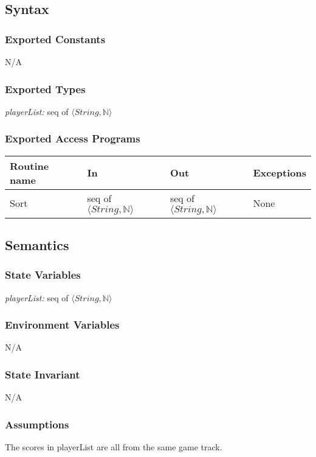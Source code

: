 \documentclass[12pt]{article}
\begin{document}
\subsection{Syntax}
\subsubsection{Exported Constants}
N/A

\subsubsection{Exported Types}
\textit{playerList:} seq of $\langle String, \mathbb{N} \rangle$

\subsubsection{Exported Access Programs}
\begin{tabular}{| l | l | l | l |}
\hline
\textbf{Routine name} & \textbf{In} & \textbf{Out} & \textbf{Exceptions}\\
\hline
Sort & seq of $\langle String, \mathbb{N} \rangle$ & seq of $\langle String, \mathbb{N} \rangle$ & None\\
\hline
\end{tabular}

\subsection{Semantics}
\subsubsection{State Variables}
\textit{playerList:} seq of $\langle String, \mathbb{N} \rangle$

\subsubsection{Environment Variables}
N/A

\subsubsection{State Invariant}
N/A

\subsubsection{Assumptions}
The scores in playerList are all from the same game track.
\end{document}
